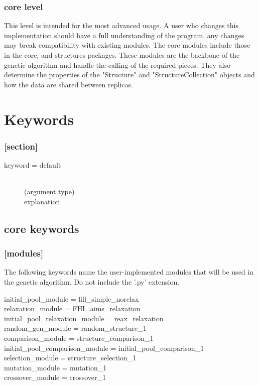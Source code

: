 	\subsubsection{core level} This level is intended for the most advanced usage. A user who changes this implementation should have a full understanding of the program. any changes may break compatibility with existing modules. The core modules include those in the core, and structures packages. These modules are the backbone of the genetic algorithm and handle the calling of the required pieces. They also determine the properties of the "Structure" and "StructureCollection" objects and how the data are shared between replicas.
	

\section{Keywords}
\subsubsection{[section]}
\begin{description}
	\item[keyword = default]~\\
		(argument type)\\
			explanation
\end{description}


\subsection{core keywords}

\subsubsection{[modules]}
		The following keywords name the user-implemented modules that will be used in the genetic algorithm. Do not include the '.py' extension.
\begin{description}
	\item[initial\_pool\_module = fill\_simple\_norelax]
	\item[relaxation\_module = FHI\_aims\_relaxation]
	\item[initial\_pool\_relaxation\_module = reax\_relaxation ]
	\item[random\_gen\_module = random\_structure\_1]
	\item[comparison\_module = structure\_comparison\_1]
	\item[initial\_pool\_comparison\_module = initial\_pool\_comparison\_1]
	\item[selection\_module = structure\_selection\_1]
	\item[mutation\_module = mutation\_1]
	\item[crossover\_module = crossover\_1]
\end{description}

